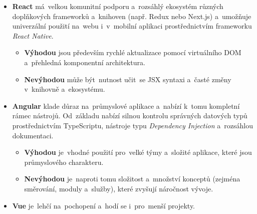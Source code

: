 \begin{itemize}
    \item \textbf{React} má~velkou komunitní podporu a~rozsáhlý ekosystém
        různých doplňkových frameworků a~knihoven (např. Redux nebo Next.js)
        a~umožňuje univerzální použití na~webu i~v~mobilní aplikaci
        prostřednictvím frameworku \emph{React Native}.
        
        \begin{itemize}
            \item \textbf{Výhodou} jsou především rychlé aktualizace
                pomocí virtuálního DOM a~přehledná komponentní
                architektura. \cite{YHVfLHsNlUItkF6G,1WL9hIh67tHjtVTy}
            \item \textbf{Nevýhodou} může být~nutnost učit~se JSX syntaxi
                a~časté změny v~knihovně a~ekosystému.
        \end{itemize}
    \item \textbf{Angular} klade důraz na~průmyslové aplikace a~nabízí
        k~tomu kompletní rámec nástrojů. Od~základu nabízí silnou kontrolu
        správných datových typů prostřednictvím TypeScriptu, nástroje
        typu \emph{Dependency Injection} a~rozsáhlou dokumentaci.
        \cite{YHVfLHsNlUItkF6G,1WL9hIh67tHjtVTy} %

        \begin{itemize}
            \item \textbf{Výhodou} je~vhodné použití pro~velké týmy
                a~složité aplikace, které jsou průmyslového charakteru.
                \cite{YHVfLHsNlUItkF6G,1WL9hIh67tHjtVTy}
            \item \textbf{Nevýhodou} je~naproti tomu složitost a~množství
                konceptů (zejména směrování, moduly a~služby), které
                zvyšují náročnost vývoje.
                \cite{YHVfLHsNlUItkF6G,1WL9hIh67tHjtVTy}
        \end{itemize}
    \item \textbf{Vue} je~lehčí na~pochopení a~hodí se i~pro~menší projekty.


\end{itemize}

